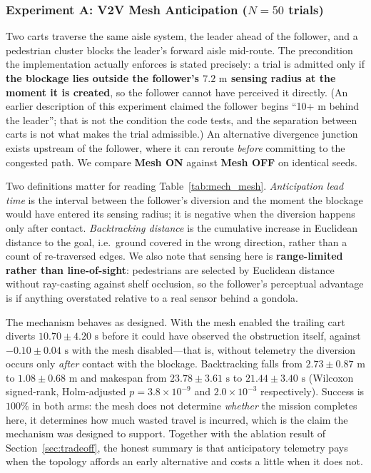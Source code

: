 \documentclass[journal]{IEEEtran}
\begin{document}
\subsubsection{Experiment A: V2V Mesh Anticipation ($N=50$ trials)}
Two carts traverse the same aisle system, the leader ahead of the follower, and a pedestrian cluster blocks the leader's forward aisle mid-route. The precondition the implementation actually enforces is stated precisely: a trial is admitted only if \textbf{the blockage lies outside the follower's $7.2\text{ m}$ sensing radius at the moment it is created}, so the follower cannot have perceived it directly. (An earlier description of this experiment claimed the follower begins ``10+ m behind the leader''; that is not the condition the code tests, and the separation between carts is not what makes the trial admissible.) An alternative divergence junction exists upstream of the follower, where it can reroute \emph{before} committing to the congested path. We compare \textbf{Mesh ON} against \textbf{Mesh OFF} on identical seeds.

Two definitions matter for reading Table~\ref{tab:mech_mesh}. \emph{Anticipation lead time} is the interval between the follower's diversion and the moment the blockage would have entered its sensing radius; it is negative when the diversion happens only after contact. \emph{Backtracking distance} is the cumulative increase in Euclidean distance to the goal, i.e.\ ground covered in the wrong direction, rather than a count of re-traversed edges. We also note that sensing here is \textbf{range-limited rather than line-of-sight}: pedestrians are selected by Euclidean distance without ray-casting against shelf occlusion, so the follower's perceptual advantage is if anything overstated relative to a real sensor behind a gondola.



The mechanism behaves as designed. With the mesh enabled the trailing cart diverts $10.70 \pm 4.20\text{ s}$ before it could have observed the obstruction itself, against $-0.10 \pm 0.04\text{ s}$ with the mesh disabled---that is, without telemetry the diversion occurs only \emph{after} contact with the blockage. Backtracking falls from $2.73 \pm 0.87\text{ m}$ to $1.08 \pm 0.68\text{ m}$ and makespan from $23.78 \pm 3.61\text{ s}$ to $21.44 \pm 3.40\text{ s}$ (Wilcoxon signed-rank, Holm-adjusted $p = 3.8 \times 10^{-9}$ and $2.0 \times 10^{-3}$ respectively). Success is $100\%$ in both arms: the mesh does not determine \emph{whether} the mission completes here, it determines how much wasted travel is incurred, which is the claim the mechanism was designed to support. Together with the ablation result of Section~\ref{sec:tradeoff}, the honest summary is that anticipatory telemetry pays when the topology affords an early alternative and costs a little when it does not.
\end{document}
